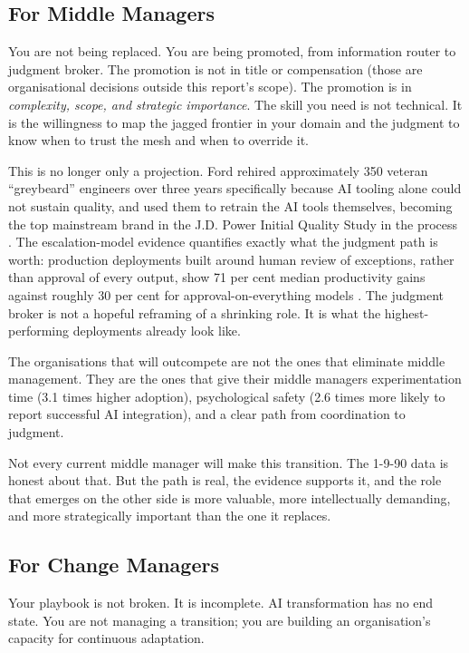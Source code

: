 \subsection{For Middle Managers}

You are not being replaced. You are being promoted, from information router to judgment broker. The promotion is not in title or compensation (those are organisational decisions outside this report's scope). The promotion is in \emph{complexity, scope, and strategic importance}. The skill you need is not technical. It is the willingness to map the jagged frontier in your domain and the judgment to know when to trust the mesh and when to override it.

This is no longer only a projection. Ford rehired approximately 350 veteran ``greybeard'' engineers over three years specifically because AI tooling alone could not sustain quality, and used them to retrain the AI tools themselves, becoming the top mainstream brand in the J.D. Power Initial Quality Study in the process \parencite{Bloomberg2026Ford}. The escalation-model evidence quantifies exactly what the judgment path is worth: production deployments built around human review of exceptions, rather than approval of every output, show 71 per cent median productivity gains against roughly 30 per cent for approval-on-everything models \parencite{Pereira2026Playbook}. The judgment broker is not a hopeful reframing of a shrinking role. It is what the highest-performing deployments already look like.

The organisations that will outcompete are not the ones that eliminate middle management. They are the ones that give their middle managers experimentation time (3.1 times higher adoption), psychological safety (2.6 times more likely to report successful AI integration), and a clear path from coordination to judgment.

Not every current middle manager will make this transition. The 1-9-90 data is honest about that. But the path is real, the evidence supports it, and the role that emerges on the other side is more valuable, more intellectually demanding, and more strategically important than the one it replaces.

\subsection{For Change Managers}

Your playbook is not broken. It is incomplete. AI transformation has no end state. You are not managing a transition; you are building an organisation's capacity for continuous adaptation.

